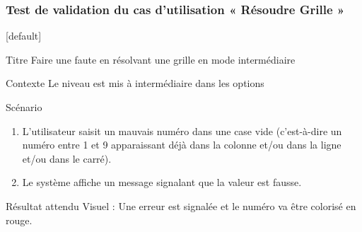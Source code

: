 \documentclass{beamer}
\begin{document}
\begin{frame}
  \frametitle{Test de validation  du cas d'utilisation « Résoudre Grille »}
  [default]
  \begin{block}{\footnotesize{Titre}}
    \scriptsize{Faire une faute en résolvant une grille en mode intermédiaire}
  \end{block}
  \pause
  \begin{block}{\footnotesize{Contexte}}
    \scriptsize{Le niveau est mis à intermédiaire dans les options}
  \end{block}
  \pause
  \begin{block}{\footnotesize{Scénario}}
    \begin{enumerate}
      [circle]
    \item
      \scriptsize{L’utilisateur saisit un mauvais numéro dans une case vide (c’est-à-dire un numéro entre 1 et 9 apparaissant déjà dans la colonne et/ou dans la ligne et/ou dans le carré).}
    \item
      \scriptsize{Le système affiche un message signalant que la valeur est fausse.}
      \end{enumerate}
    \end{block}
    \pause
    \begin{block}{\footnotesize{Résultat attendu}}
      \scriptsize{Visuel : Une erreur est signalée et le numéro va être colorisé en rouge.}
    \end{block}
  \end{frame}
  
\end{document}
